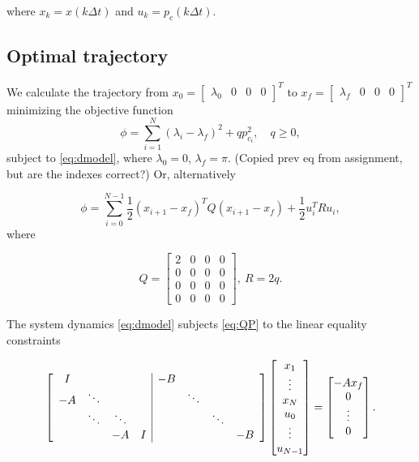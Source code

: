where $x_k = x(k\Delta t)$ and $u_k = p_c(k\Delta t)$.

\subsection{Optimal trajectory}

We calculate the trajectory from $x_0 = \begin{bmatrix}\lambda_0&0&0&0\end{bmatrix}^T$ to $x_f = \begin{bmatrix}\lambda_f&0&0&0\end{bmatrix}^T$ minimizing the objective function 
\begin{equation*}
	\phi = \sum_{i=1}^{N}(\lambda_i - \lambda_f)^2 + qp^2_{c_i}, \quad q \ge 0,
\end{equation*}
subject to \eqref{eq:dmodel}, where $\lambda_0 = 0$, $\lambda_f = \pi$. (Copied prev eq from assignment, but are the indexes correct?) Or, alternatively

\begin{equation}
	\label{eq:QP}
	\phi = \sum_{i=0}^{N-1} \frac{1}{2}(x_{i+1}-x_f)^TQ(x_{i+1}-x_f) + \frac{1}{2}u_i^TRu_i,
\end{equation}
where

\begin{equation}
Q = \begin{bmatrix}2&0&0&0\\0&0&0&0\\0&0&0&0\\0&0&0&0\end{bmatrix}, \ R = 2q.
\end{equation}

The system dynamics \eqref{eq:dmodel} subjects \eqref{eq:QP} to the linear equality constraints

\begin{equation}
	\label{eq:eq_constraints}
	\left[\begin{array}{cccc | ccccc}
	I	&&&&			-B	&&&			\\
	-A	&\ddots&&&			&\ddots&&	\\
		&\ddots&\ddots&&	&&\ddots&	\\
		&& -A & I&			&&& -B		\\
	\end{array}\right]
\begin{bmatrix} x_1 \\ \vdots \\ x_N \\ u_0 \\ \vdots \\ u_{N-1} \end{bmatrix}
=
\begin{bmatrix}
-A x_f \\ 0 \\ \vdots \\ 0      
\end{bmatrix}.
\end{equation}

